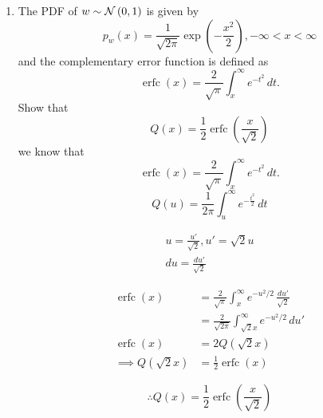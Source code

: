 \documentclass[10pt, a4paper]{article}
\providecommand{\brak}[1]{\ensuremath{\left(#1\right)}}
\begin{document}
\begin{enumerate}
\item The PDF of $w \sim \mathcal{N}\left(0,1\right)$ is given by
%
\begin{equation}
p_{w}(x) = \frac{1}{\sqrt{2\pi}}\exp\brak{-\frac{x^2}{2}}, -\infty < x < \infty
\end{equation}
and the complementary error function is defined as
\begin{equation}
\operatorname {erfc} (x)={\frac {2}{\sqrt {\pi }}}\int _{x}^{\infty }e^{-t^{2}}\,dt.
\end{equation}
%
Show that 
\begin{equation}
Q(x) = \frac{1}{2}\operatorname {erfc}\left({\frac  {x}{{\sqrt  {2}}}}\right)
\end{equation}
\solution 
we know that
\begin{equation}
\operatorname {erfc} (x)={\frac {2}{\sqrt {\pi }}}\int _{x}^{\infty }e^{-t^{2}}\,dt.
\end{equation}
\begin{equation}
Q(u) = \frac{1}{2\pi}\int^{\infty}_{u}e^{-\frac{t^2}{2}}\,dt
\end{equation}

\begin{align}
 u=\frac{u'}{\sqrt{2}}  ,u'=\sqrt{2}u\\
 du=\frac{du'}{\sqrt{2}}
\end{align}

\begin{align}
\operatorname {erfc} (x)&={\frac {2}{\sqrt {\pi }}}\int _{x}^{\infty }e^{-u^{2}/2}\,\frac{du'}{\sqrt{2}}  \\
&={\frac {2}{\sqrt {2\pi }}}\int _{\sqrt{2}x}^{\infty }e^{-u^{2}/2}\,du'\\
\operatorname {erfc} (x)&=2Q(\sqrt{2}x)\\
\implies Q(\sqrt{2}x)&=\frac{1}{2}\operatorname {erfc} (x)
\end{align}


\begin{equation}
\therefore Q(x) = \frac{1}{2}\operatorname {erfc}\left({\frac  {x}{{\sqrt  {2}}}}\right)
\end{equation}



\end{enumerate}
\end{document}
